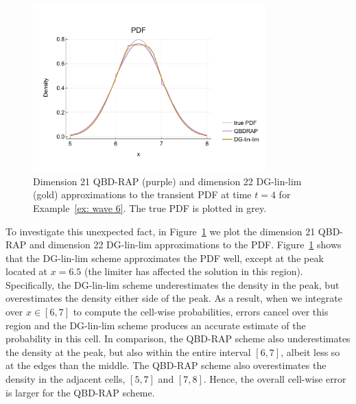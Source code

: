 \begin{example}
	\begin{figure}[h]
		\centering
		\includegraphics[width=0.8\textwidth,trim={0cm 1.25cm 0cm 1.25cm},clip]{chapter6/figs/wave/fun6/order_21_PDFs_formatted.pdf}
		\caption{Dimension 21 QBD-RAP (purple) and dimension 22 DG-lin-lim (gold) approximations to the transient PDF at time \(t=4\) for Example~\ref{ex: wave 6}. The true PDF is plotted in grey.}  
		\label{fig: fun 6 wave pdfs} 
	\end{figure}
	To investigate this unexpected fact, in Figure~\ref{fig: fun 6 wave pdfs} we plot the dimension 21 QBD-RAP and dimension 22 DG-lin-lim approximations to the PDF. Figure~\ref{fig: fun 6 wave pdfs} shows that the DG-lin-lim scheme approximates the PDF well, except at the peak located at \(x=6.5\) (the limiter has affected the solution in this region). Specifically, the DG-lin-lim scheme underestimates the density in the peak, but overestimates the density either side of the peak. As a result, when we integrate over \(x\in[6,7]\) to compute the cell-wise probabilities, errors cancel over this region and the DG-lin-lim scheme produces an accurate estimate of the probability in this cell. In comparison, the QBD-RAP scheme also underestimates the density at the peak, but also within the entire interval \([6,7]\), albeit less so at the edges than the middle. The QBD-RAP scheme also overestimates the density in the adjacent cells, \([5,7]\) and \([7,8]\). Hence, the overall cell-wise error is larger for the QBD-RAP scheme.
\end{example}

